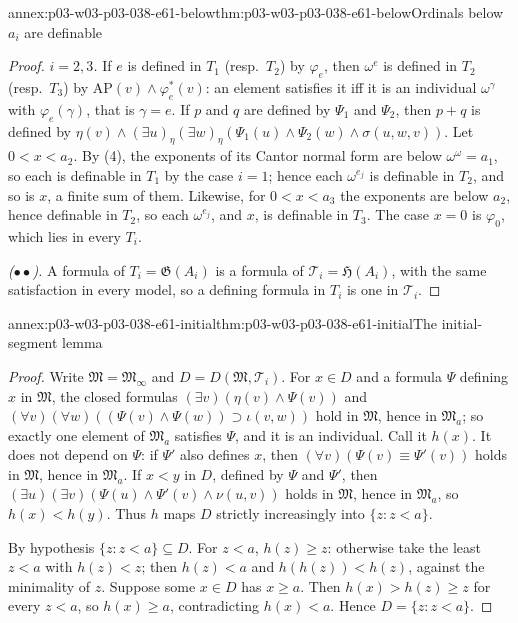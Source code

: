\begin{annexitem}{annex:p03-w03-p03-038-e61-below}{thm:p03-w03-p03-038-e61-below}{Ordinals below \(a_i\) are definable}
\begin{proof}
\emph{\(i=2,3\).} If \(e\) is defined in \(T_1\) (resp.\ \(T_2\)) by
\(\varphi_e\), then \(\omega^e\) is defined in \(T_2\) (resp.\ \(T_3\)) by
\(\mathrm{AP}(v)\wedge\varphi_e^*(v)\): an element satisfies it iff it is
an individual \(\omega^\gamma\) with \(\varphi_e(\gamma)\), that is
\(\gamma=e\). If \(p\) and \(q\) are defined by \(\Psi_1\) and \(\Psi_2\),
then \(p+q\) is defined by \(\eta(v)\wedge(\exists u)_\eta(\exists w)_\eta
(\Psi_1(u)\wedge\Psi_2(w)\wedge\sigma(u,w,v))\). Let \(0<x<a_2\). By (4),
the exponents of its Cantor normal form are below \(\omega^\omega=a_1\),
so each is definable in \(T_1\) by the case \(i=1\); hence each
\(\omega^{e_j}\) is definable in \(T_2\), and so is \(x\), a finite sum of
them. Likewise, for \(0<x<a_3\) the exponents are below \(a_2\), hence
definable in \(T_2\), so each \(\omega^{e_j}\), and \(x\), is definable in
\(T_3\). The case \(x=0\) is \(\varphi_0\), which lies in every \(T_i\).

\emph{(\(\bullet\bullet\)).} A formula of \(T_i=\mathfrak G(A_i)\) is a
formula of \(\mathcal T_i=\mathfrak H(A_i)\), with the same satisfaction
in every model, so a defining formula in \(T_i\) is one in
\(\mathcal T_i\).
\end{proof}
\end{annexitem}

\begin{annexitem}{annex:p03-w03-p03-038-e61-initial}{thm:p03-w03-p03-038-e61-initial}{The initial-segment lemma}
\begin{proof}
Write \(\mathfrak M=\mathfrak M_\infty\) and \(D=D(\mathfrak M,
\mathcal T_i)\). For \(x\in D\) and a formula \(\Psi\) defining \(x\) in
\(\mathfrak M\), the closed formulas
\((\exists v)(\eta(v)\wedge\Psi(v))\) and
\((\forall v)(\forall w)((\Psi(v)\wedge\Psi(w))\supset\iota(v,w))\) hold
in \(\mathfrak M\), hence in \(\mathfrak M_a\); so exactly one element of
\(\mathfrak M_a\) satisfies \(\Psi\), and it is an individual. Call it
\(h(x)\). It does not depend on \(\Psi\): if \(\Psi'\) also defines
\(x\), then \((\forall v)(\Psi(v)\equiv\Psi'(v))\) holds in
\(\mathfrak M\), hence in \(\mathfrak M_a\). If \(x<y\) in \(D\), defined
by \(\Psi\) and \(\Psi'\), then
\((\exists u)(\exists v)(\Psi(u)\wedge\Psi'(v)\wedge\nu(u,v))\) holds in
\(\mathfrak M\), hence in \(\mathfrak M_a\), so \(h(x)<h(y)\). Thus
\(h\) maps \(D\) strictly increasingly into \(\{z:z<a\}\).

By hypothesis \(\{z:z<a\}\subseteq D\). For \(z<a\), \(h(z)\ge z\):
otherwise take the least \(z<a\) with \(h(z)<z\); then \(h(z)<a\) and
\(h(h(z))<h(z)\), against the minimality of \(z\). Suppose some
\(x\in D\) has \(x\ge a\). Then \(h(x)>h(z)\ge z\) for every \(z<a\), so
\(h(x)\ge a\), contradicting \(h(x)<a\). Hence \(D=\{z:z<a\}\).
\end{proof}
\end{annexitem}

